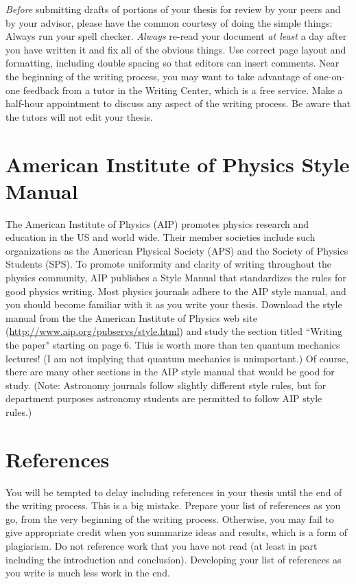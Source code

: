 \emph{Before} submitting drafts of portions of your thesis for
review by your peers and by your advisor, please have the common
courtesy of doing the simple things: Always run your spell checker.
\emph{Always} re-read your document \emph{at least} a day after you
have written it and fix all of the obvious things. Use correct page
layout and formatting, including double spacing so that editors can
insert comments. Near the beginning of the writing process, you may
want to take advantage of one-on-one feedback from a tutor in the
Writing Center, which is a free service. Make a half-hour
appointment to discuss any aspect of the writing process. Be aware
that the tutors will not edit your thesis.

\section{American Institute of Physics Style Manual}
\label{sec:AIPManual} 

The American Institute of Physics (AIP) promotes physics research
and education in the US and world wide. Their member societies
include such organizations as the American Physical Society (APS)
and the Society of Physics Students (SPS). To promote uniformity
and clarity of writing throughout the physics community, AIP
publishes a Style Manual \cite{AIP1990} that standardizes the rules
for good physics writing. Most physics journals adhere to the AIP
style manual, and you should become familiar with it as you write
your thesis. Download the style manual from the the American
Institute of Physics web site
(\href{http://www.aip.org/pubservs/style.html}{\url{http://www.aip.org/pubservs/style.html}})
and study the section titled ``Writing the paper" starting on page
6. This is worth more than ten quantum mechanics lectures! (I am
not implying that quantum mechanics is unimportant.) Of course,
there are many other sections in the AIP style manual that would be
good for study. (Note: Astronomy journals follow slightly different
style rules, but for department purposes astronomy students are
permitted to follow AIP style rules.)

\section{References}
\label{sec:References} 

You will be tempted to delay including references in your thesis
until the end of the writing process. This is a big mistake. Prepare
your list of references as you go, from the very beginning of the
writing process. Otherwise, you may fail to give appropriate credit
when you summarize ideas and results, which is a form of plagiarism.
Do not reference work that you have not read (at least in part
including the introduction and conclusion). Developing your list of
references as you write is much less work in the end.

